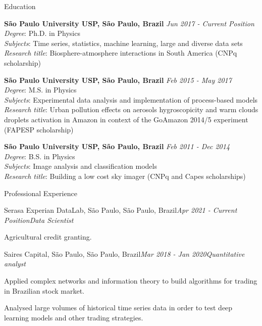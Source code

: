 \documentclass{resume} %
\begin{document}

\begin{rSection}{Education}

{\bf São Paulo University USP, São Paulo, Brazil} \hfill {\em Jun 2017 - Current Position} \\
\textit{Degree}: Ph.D. in Physics \\
\textit{Subjects}: Time series, statistics, machine learning, large and diverse data sets  \\
\textit{Research title}: Biosphere-atmosphere interactions in South America (CNPq scholarship)

{\bf São Paulo University USP, São Paulo, Brazil} \hfill {\em Feb 2015 - May 2017} \\
\textit{Degree}: M.S. in Physics \\
\textit{Subjects}: Experimental data analysis and implementation of process-based models \\
\textit{Research title}: Urban pollution effects on aerosols hygroscopicity and warm clouds droplets activation in Amazon in context of the GoAmazon 2014/5 experiment (FAPESP scholarship) 

{\bf São Paulo University USP, São Paulo, Brazil} \hfill {\em Feb 2011 - Dec 2014} \\
\textit{Degree}: B.S. in Physics \\
\textit{Subjects}: Image analysis and classification models \\
\textit{Research title}: Building a low cost sky imager (CNPq and Capes scholarships) 

\end{rSection}


\begin{rSection}{Professional Experience}

\begin{rSubsection}{Serasa Experian DataLab, São Paulo, São Paulo, Brazil}{\em Apr 2021 - Current Position}{\em Data Scientist}{}
\item Agricultural credit granting.
\end{rSubsection}

\begin{rSubsection}{Saires Capital, São Paulo, São Paulo, Brazil}{\em Mar 2018 - Jan 2020}{\em Quantitative analyst}{}
\item Applied complex networks and information theory to build algorithms for trading in Brazilian stock market. 
\item Analysed large volumes of historical time series data in order to test deep learning models and other trading strategies. 
\end{rSubsection}

\end{rSection}
\end{document}

